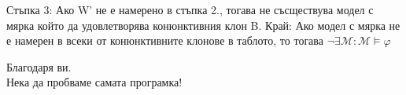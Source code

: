 \documentclass{beamer}
\begin{document}
\begin{frame}
Стъпка 3:
\newline
Ако W' не е намерено в стъпка 2., тогава не съсществува модел с мярка който да удовлетворява конюнктивния клон B.
\newline
\newline
Край:
\newline
Ако модел с мярка не е намерен в всеки от конюнктивните клонове в таблото, то тогава $\neg \exists \mathcal{M}: \mathcal{M} \models \varphi$ 

\end{frame}

\begin{frame}
Благодаря ви. \\
Нека да пробваме самата програмка!
\end{frame}
\end{document}
